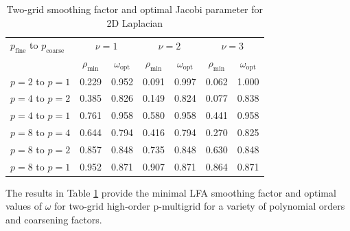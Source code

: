 \documentclass[review]{siamart190516}
\begin{document}
\begin{table}[ht!]
\begin{center}
\begin{tabular}{l cc cc cc}
  \toprule
  $p_{\text{fine}}$ to $p_{\text{coarse}}$  &  \multicolumn{2}{c}{$\nu = 1$}            &  \multicolumn{2}{c}{$\nu = 2$}         &  \multicolumn{2}{c}{$\nu = 3$}           \\
                                            &  $\rho_{\min}$  &  $\omega_{\text{opt}}$  &  $\rho_{\min}$ & $\omega_{\text{opt}}$  &  $\rho_{\min}$ & $\omega_{\text{opt}}$  \\
  \midrule
  $p = 2$ to $p = 1$          &  0.229 & 0.952  &  0.091 & 0.997  &  0.062 & 1.000   \\
  $p = 4$ to $p = 2$          &  0.385 & 0.826  &  0.149 & 0.824  &  0.077 & 0.838   \\
  $p = 4$ to $p = 1$          &  0.761 & 0.958  &  0.580 & 0.958  &  0.441 & 0.958   \\
  $p = 8$ to $p = 4$          &  0.644 & 0.794  &  0.416 & 0.794  &  0.270 & 0.825   \\
  $p = 8$ to $p = 2$          &  0.857 & 0.848  &  0.735 & 0.848  &  0.630 & 0.848   \\
  $p = 8$ to $p = 1$          &  0.952 & 0.871  &  0.907 & 0.871  &  0.864 & 0.871   \\
  \bottomrule
\end{tabular}
\end{center}
\caption{Two-grid smoothing factor and optimal Jacobi parameter for 2D Laplacian}
\label{table:two_grid_2d}
\end{table}

The results in Table \ref{table:two_grid_2d} provide the minimal LFA smoothing factor and optimal values of $\omega$ for two-grid high-order p-multigrid for a variety of polynomial orders and coarsening factors.
\end{document}
